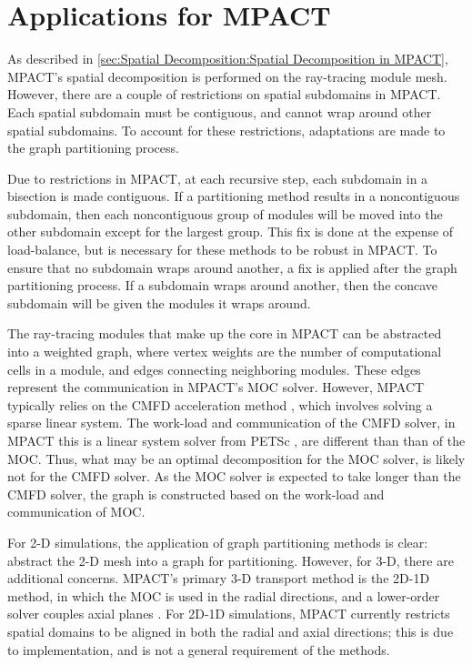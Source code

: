 {  \section{Applications for MPACT}{\label{sec:Spatial Decomposition:Applications for MPACT}
    As described in \cref{sec:Spatial Decomposition:Spatial Decomposition in MPACT}, MPACT's spatial decomposition is performed on the ray-tracing module mesh.
    However, there are a couple of restrictions on spatial subdomains in MPACT.
    Each spatial subdomain must be contiguous, and cannot wrap around other spatial subdomains.
    To account for these restrictions, adaptations are made to the graph partitioning process.

    Due to restrictions in MPACT, at each recursive step, each subdomain in a bisection is made contiguous.
    If a partitioning method results in a noncontiguous subdomain, then each noncontiguous group of modules will be moved into the other subdomain except for the largest group.
    This fix is done at the expense of load-balance, but is necessary for these methods to be robust in MPACT.
    To ensure that no subdomain wraps around another, a fix is applied after the graph partitioning process.
    If a subdomain wraps around another, then the concave subdomain will be given the modules it wraps around.

    The ray-tracing modules that make up the core in MPACT can be abstracted into a weighted graph, where vertex weights are the number of computational cells in a module, and edges connecting neighboring modules.
    These edges represent the communication in MPACT's \ac{MOC} solver.
    However, MPACT typically relies on the \ac{CMFD} acceleration method \cite{Smith1983}, which involves solving a sparse linear system.
    The work-load and communication of the \ac{CMFD} solver, in MPACT this is a linear system solver from PETSc \cite{Petsc}, are different than than of the \ac{MOC}.
    Thus, what may be an optimal decomposition for the \ac{MOC} solver, is likely not for the \ac{CMFD} solver.
    As the \ac{MOC} solver is expected to take longer than the \ac{CMFD} solver, the graph is constructed based on the work-load and communication of \ac{MOC}.

    For 2-D simulations, the application of graph partitioning methods is clear: abstract the 2-D mesh into a graph for partitioning.
    However, for 3-D, there are additional concerns.
    MPACT's primary 3-D transport method is the 2D-1D method, in which the \ac{MOC} is used in the radial directions, and a lower-order solver couples axial planes \cite{Collins2016}.
    For 2D-1D simulations, MPACT currently restricts spatial domains to be aligned in both the radial and axial directions; this is due to implementation, and is not a general requirement of the methods.

}}
